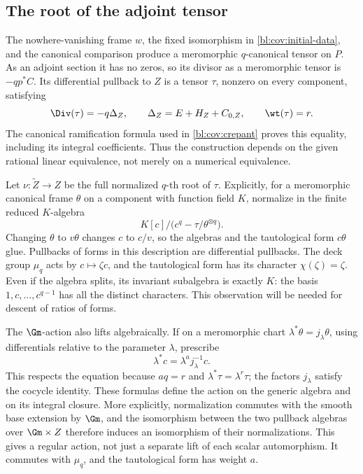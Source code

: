 \subsection{The root of the adjoint tensor}

The nowhere-vanishing frame $w$, the fixed isomorphism in
\eqref{bl:cov:initial-data}, and the canonical comparison produce a
meromorphic $q$-canonical tensor on $P$.  As an adjoint section it has
no zeros, so its divisor as a meromorphic tensor is $-qp^*C$.
Its differential pullback to $Z$ is a tensor $\tau$, nonzero on every
component, satisfying
\begin{equation}\label{bl:cov:tau}
 \Div(\tau)=-q\Delta_Z,\qquad
 \Delta_Z=E+H_Z+C_{0,Z},\qquad \wt(\tau)=r.
\end{equation}
The canonical ramification formula used in
\eqref{bl:cov:crepant} proves this equality, including its integral
coefficients.  Thus the construction depends on the given rational
linear equivalence, not merely on a numerical equivalence.

Let $\nu:\widetilde Z\to Z$ be the full normalized $q$-th root of
$\tau$.  Explicitly, for a meromorphic canonical frame $\theta$ on a
component with function field $K$, normalize in the finite reduced
$K$-algebra
\begin{equation}\label{bl:cov:second-algebra}
 K[c]/\bigl(c^q-\tau/\theta^{\otimes q}\bigr).
\end{equation}
Changing $\theta$ to $v\theta$ changes $c$ to $c/v$, so the algebras
and the tautological form $c\theta$ glue.  Pullbacks of forms in this
description are differential pullbacks.  The deck group $\mu_q$ acts
by $c\mapsto\zeta c$, and the tautological form has its character
$\chi(\zeta)=\zeta$.  Even if the algebra splits, its invariant
subalgebra is exactly $K$: the basis $1,c,\ldots,c^{q-1}$ has all the
distinct characters.  This observation will be needed for descent of
ratios of forms.

The $\Gm$-action also lifts algebraically.  If on a meromorphic chart
$\lambda^*\theta=j_\lambda\theta$, using differentials relative to the
parameter $\lambda$, prescribe
\begin{equation}\label{bl:cov:second-action}
 \lambda^*c=\lambda^a j_\lambda^{-1}c.
\end{equation}
This respects the equation because $aq=r$ and
$\lambda^*\tau=\lambda^r\tau$; the factors $j_\lambda$ satisfy the
cocycle identity.  These formulas define the action on the generic
algebra and on its integral closure.  More explicitly, normalization
commutes with the smooth base extension by $\Gm$, and the isomorphism
between the two pullback algebras over $\Gm\times Z$ therefore induces
an isomorphism of their normalizations.  This gives a regular action,
not just a separate lift of each scalar automorphism.  It commutes
with $\mu_q$, and the tautological form has weight $a$.

